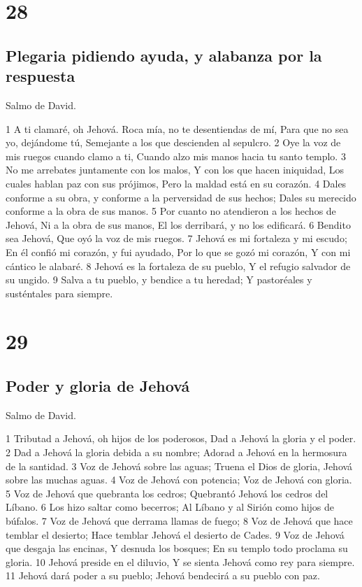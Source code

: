 \chapter{28}

\section*{Plegaria pidiendo ayuda, y alabanza por la respuesta}

Salmo de David.

1 A ti clamaré, oh Jehová.
Roca mía, no te desentiendas de mí,
Para que no sea yo, dejándome tú,
Semejante a los que descienden al sepulcro.
2 Oye la voz de mis ruegos cuando clamo a ti,
Cuando alzo mis manos hacia tu santo templo.
3 No me arrebates juntamente con los malos,
Y con los que hacen iniquidad,
Los cuales hablan paz con sus prójimos,
Pero la maldad está en su corazón.
4 Dales conforme a su obra, y conforme a la perversidad de sus hechos;
Dales su merecido conforme a la obra de sus manos.
5 Por cuanto no atendieron a los hechos de Jehová,
Ni a la obra de sus manos,
El los derribará, y no los edificará.
6 Bendito sea Jehová,
Que oyó la voz de mis ruegos.
7 Jehová es mi fortaleza y mi escudo;
En él confió mi corazón, y fui ayudado,
Por lo que se gozó mi corazón,
Y con mi cántico le alabaré.
8 Jehová es la fortaleza de su pueblo,
Y el refugio salvador de su ungido.
9 Salva a tu pueblo, y bendice a tu heredad;
Y pastoréales y susténtales para siempre.

\chapter{29}

\section*{Poder y gloria de Jehová}

Salmo de David.

1 Tributad a Jehová, oh hijos de los poderosos,
Dad a Jehová la gloria y el poder.
2 Dad a Jehová la gloria debida a su nombre;
Adorad a Jehová en la hermosura de la santidad.
3 Voz de Jehová sobre las aguas;
Truena el Dios de gloria,
Jehová sobre las muchas aguas.
4 Voz de Jehová con potencia;
Voz de Jehová con gloria.
5 Voz de Jehová que quebranta los cedros;
Quebrantó Jehová los cedros del Líbano.
6 Los hizo saltar como becerros;
Al Líbano y al Sirión como hijos de búfalos.
7 Voz de Jehová que derrama llamas de fuego;
8 Voz de Jehová que hace temblar el desierto;
Hace temblar Jehová el desierto de Cades.
9 Voz de Jehová que desgaja las encinas,
Y desnuda los bosques;
En su templo todo proclama su gloria.
10 Jehová preside en el diluvio,
Y se sienta Jehová como rey para siempre.
11 Jehová dará poder a su pueblo;
Jehová bendecirá a su pueblo con paz.

